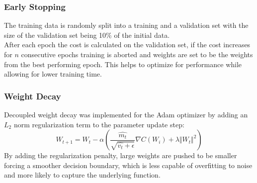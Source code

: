 \subsubsection{Early Stopping}
The training data is randomly split into a training and a validation set with the size of the validation set being 10\% of the initial data.\\
After each epoch the cost is calculated on the validation set, if the cost increases for $n$ consecutive epochs training is aborted and weights are set to be the weights from the best performing epoch. This helps to optimize for performance while allowing for lower training time.

\subsubsection{Weight Decay}
Decoupled weight decay was implemented for the Adam optimizer by adding an $L_2$ norm regularization term to the parameter update step:
$$
W_{t+1} = W_t - \alpha (\frac{\hat{m_t}}{\sqrt{\hat{v_t}+\epsilon}}\nabla C(W_i) + \lambda \Vert W_t \Vert^2)
$$
By adding the regularization penalty, large weights are pushed to be smaller forcing a smoother decision boundary, which is less capable of overfitting to noise and more likely to capture the underlying function.


